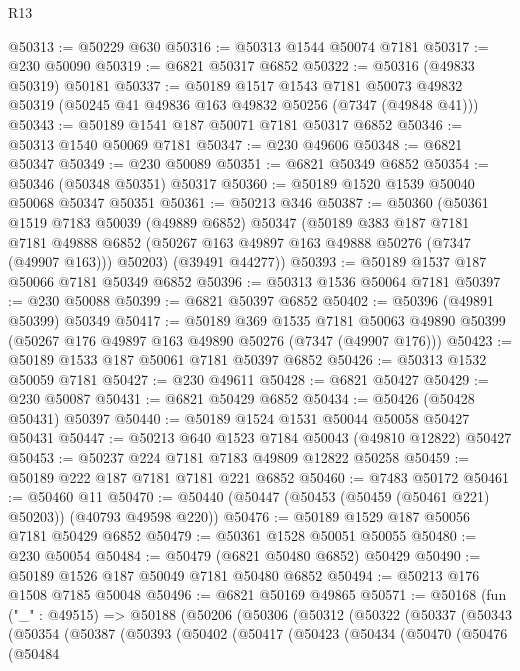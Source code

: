 \begin{lexlean}{R13}
\begin{coremodule}
@50313 := @50229 @630
@50316 := @50313 @1544 @50074 @7181
@50317 := @230 @50090
@50319 := @6821 @50317 @6852
@50322 := @50316 (@49833 @50319) @50181
@50337 := @50189
    @1517
    @1543
    @7181
    @50073
    @49832
    @50319
    (@50245 @41 @49836 @163 @49832 @50256 (@7347 (@49848 @41)))
@50343 := @50189 @1541 @187 @50071 @7181 @50317 @6852
@50346 := @50313 @1540 @50069 @7181
@50347 := @230 @49606
@50348 := @6821 @50347
@50349 := @230 @50089
@50351 := @6821 @50349 @6852
@50354 := @50346 (@50348 @50351) @50317
@50360 := @50189 @1520 @1539 @50040 @50068 @50347 @50351
@50361 := @50213 @346
@50387 := @50360
    (@50361
      @1519
      @7183
      @50039
      (@49889 @6852)
      @50347
      (@50189
        @383
        @187
        @7181
        @7181
        @49888
        @6852
        (@50267 @163 @49897 @163 @49888 @50276 (@7347 (@49907 @163)))
        @50203)
      (@39491 @44277))
@50393 := @50189 @1537 @187 @50066 @7181 @50349 @6852
@50396 := @50313 @1536 @50064 @7181
@50397 := @230 @50088
@50399 := @6821 @50397 @6852
@50402 := @50396 (@49891 @50399) @50349
@50417 := @50189
    @369
    @1535
    @7181
    @50063
    @49890
    @50399
    (@50267 @176 @49897 @163 @49890 @50276 (@7347 (@49907 @176)))
@50423 := @50189 @1533 @187 @50061 @7181 @50397 @6852
@50426 := @50313 @1532 @50059 @7181
@50427 := @230 @49611
@50428 := @6821 @50427
@50429 := @230 @50087
@50431 := @6821 @50429 @6852
@50434 := @50426 (@50428 @50431) @50397
@50440 := @50189 @1524 @1531 @50044 @50058 @50427 @50431
@50447 := @50213 @640 @1523 @7184 @50043 (@49810 @12822) @50427
@50453 := @50237 @224 @7181 @7183 @49809 @12822 @50258
@50459 := @50189 @222 @187 @7181 @7181 @221 @6852
@50460 := @7483 @50172
@50461 := @50460 @11
@50470 := @50440 (@50447 (@50453 (@50459 (@50461 @221) @50203)) (@40793 @49598 @220))
@50476 := @50189 @1529 @187 @50056 @7181 @50429 @6852
@50479 := @50361 @1528 @50051 @50055
@50480 := @230 @50054
@50484 := @50479 (@6821 @50480 @6852) @50429
@50490 := @50189 @1526 @187 @50049 @7181 @50480 @6852
@50494 := @50213 @176 @1508 @7185 @50048
@50496 := @6821 @50169 @49865
@50571 := @50168
    (fun ("_" : @49515) =>
    @50188
      (@50206
        (@50306
          (@50312
            (@50322
              (@50337
                (@50343
                  (@50354
                    (@50387
                      (@50393
                        (@50402
                          (@50417
                            (@50423
                              (@50434
                                (@50470
                                  (@50476
                                    (@50484

\end{coremodule}
\end{lexlean}
